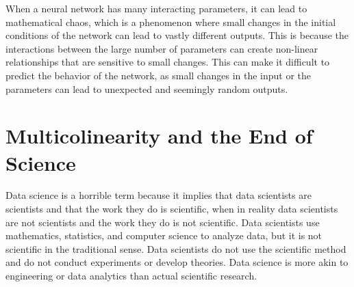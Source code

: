 When a neural network has many interacting parameters, it can lead to mathematical chaos, which is a phenomenon where small changes in the initial conditions of the network can lead to vastly different outputs. This is because the interactions between the large number of parameters can create non-linear relationships that are sensitive to small changes. This can make it difficult to predict the behavior of the network, as small changes in the input or the parameters can lead to unexpected and seemingly random outputs.

\section{Multicolinearity and the End of Science}

Data science is a horrible term because it implies that data scientists are scientists and that the work they do is scientific, when in reality data scientists are not scientists and the work they do is not scientific. Data scientists use mathematics, statistics, and computer science to analyze data, but it is not scientific in the traditional sense. Data scientists do not use the scientific method and do not conduct experiments or develop theories. Data science is more akin to engineering or data analytics than actual scientific research.


